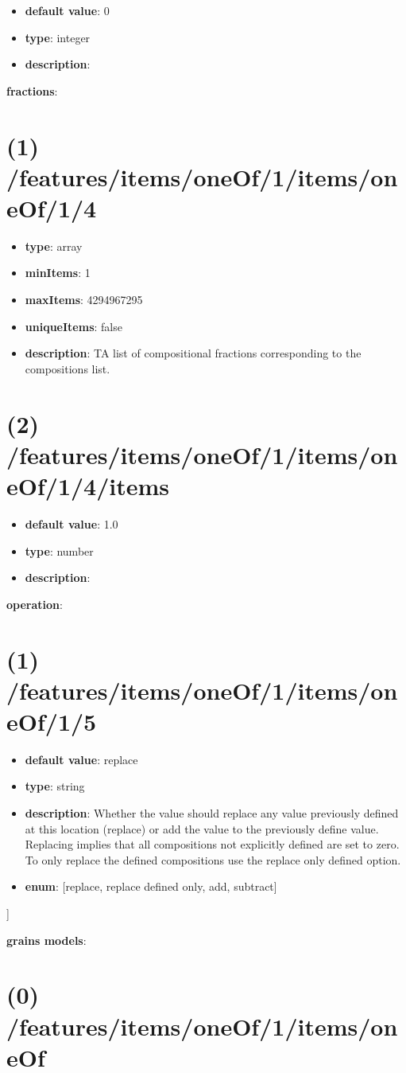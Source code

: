 \begin{itemize}[leftmargin=2em]\item {\bf default value}: 0
\item {\bf type}: integer
\item {\bf description}: 
\end{itemize}\item {\bf fractions}: \section{(1) /features/items/oneOf/1/items/oneOf/1/4}
\begin{itemize}[leftmargin=1em]\item {\bf type}: array
\item {\bf minItems}: 1
\item {\bf maxItems}: 4294967295
\item {\bf uniqueItems}: false
\item {\bf description}: TA list of compositional fractions corresponding to the compositions list.
\end{itemize}\section{(2) /features/items/oneOf/1/items/oneOf/1/4/items}
\begin{itemize}[leftmargin=2em]\item {\bf default value}: 1.0
\item {\bf type}: number
\item {\bf description}: 
\end{itemize}\item {\bf operation}: \section{(1) /features/items/oneOf/1/items/oneOf/1/5}
\begin{itemize}[leftmargin=1em]\item {\bf default value}: replace
\item {\bf type}: string
\item {\bf description}: Whether the value should replace any value previously defined at this location (replace) or add the value to the previously define value. Replacing implies that all compositions not explicitly defined are set to zero. To only replace the defined compositions use the replace only defined option.
\item {\bf enum}: [replace, replace defined only, add, subtract]\end{itemize}]\item {\bf grains models}: \section{(0) /features/items/oneOf/1/items/oneOf}
